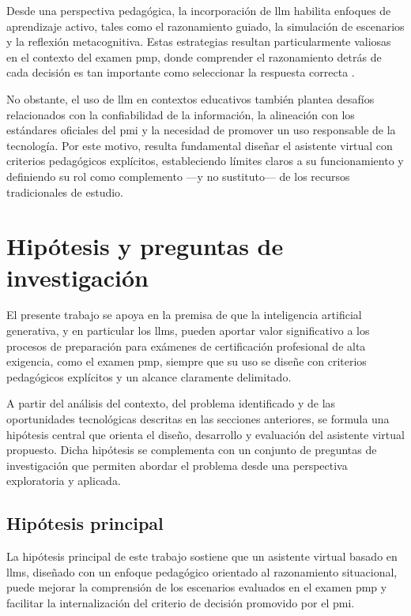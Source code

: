 Desde una perspectiva pedagógica, la incorporación de \gls{llm} habilita enfoques de aprendizaje activo, tales como el razonamiento guiado, la simulación de escenarios y la reflexión metacognitiva. Estas estrategias resultan particularmente valiosas en el contexto del examen \gls{pmp}, donde comprender el razonamiento detrás de cada decisión es tan importante como seleccionar la respuesta correcta \parencite{kasneci2023chatgpt}.

No obstante, el uso de \gls{llm} en contextos educativos también plantea desafíos relacionados con la confiabilidad de la información, la alineación con los estándares oficiales del \gls{pmi} y la necesidad de promover un uso responsable de la tecnología. Por este motivo, resulta fundamental diseñar el asistente virtual con criterios pedagógicos explícitos, estableciendo límites claros a su funcionamiento y definiendo su rol como complemento —y no sustituto— de los recursos tradicionales de estudio.

\section{Hipótesis y preguntas de investigación}

El presente trabajo se apoya en la premisa de que la inteligencia artificial generativa, y en particular los \glspl{llm}, pueden aportar valor significativo a los procesos de preparación para exámenes de certificación profesional de alta exigencia, como el examen \gls{pmp}, siempre que su uso se diseñe con criterios pedagógicos explícitos y un alcance claramente delimitado.

A partir del análisis del contexto, del problema identificado y de las oportunidades tecnológicas descritas en las secciones anteriores, se formula una hipótesis central que orienta el diseño, desarrollo y evaluación del asistente virtual propuesto. Dicha hipótesis se complementa con un conjunto de preguntas de investigación que permiten abordar el problema desde una perspectiva exploratoria y aplicada.

\subsection{Hipótesis principal}

La hipótesis principal de este trabajo sostiene que un asistente virtual basado en \glspl{llm}, diseñado con un enfoque pedagógico orientado al razonamiento situacional, puede mejorar la comprensión de los escenarios evaluados en el examen \gls{pmp} y facilitar la internalización del criterio de decisión promovido por el \gls{pmi}.

